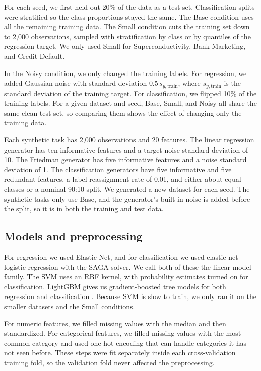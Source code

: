 \documentclass[12pt,letterpaper]{article}
\begin{document}
For each seed, we first held out 20\% of the data as a test set. Classification splits were stratified so the class proportions stayed the same. The Base condition uses all the remaining training data. The Small condition cuts the training set down to 2,000 observations, sampled with stratification by class or by quantiles of the regression target. We only used Small for Superconductivity, Bank Marketing, and Credit Default.

In the Noisy condition, we only changed the training labels. For regression, we added Gaussian noise with standard deviation \(0.5\,s_{y,\text{train}}\), where \(s_{y,\text{train}}\) is the standard deviation of the training target. For classification, we flipped 10\% of the training labels. For a given dataset and seed, Base, Small, and Noisy all share the same clean test set, so comparing them shows the effect of changing only the training data.

Each synthetic task has 2,000 observations and 20 features. The linear regression generator has ten informative features and a target-noise standard deviation of 10. The Friedman generator has five informative features and a noise standard deviation of 1. The classification generators have five informative and five redundant features, a label-reassignment rate of 0.01, and either about equal classes or a nominal 90:10 split. We generated a new dataset for each seed. The synthetic tasks only use Base, and the generator's built-in noise is added before the split, so it is in both the training and test data.

\subsection{Models and preprocessing}\label{models-and-preprocessing}

For regression we used Elastic Net, and for classification we used elastic-net logistic regression with the SAGA solver. We call both of these the linear-model family. The SVM uses an RBF kernel, with probability estimates turned on for classification. LightGBM gives us gradient-boosted tree models for both regression and classification \cite{ke17}. Because SVM is slow to train, we only ran it on the smaller datasets and the Small conditions.

For numeric features, we filled missing values with the median and then standardized. For categorical features, we filled missing values with the most common category and used one-hot encoding that can handle categories it has not seen before. These steps were fit separately inside each cross-validation training fold, so the validation fold never affected the preprocessing.
\end{document}
